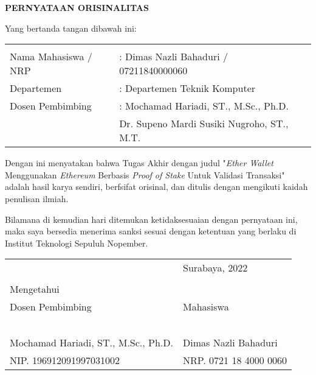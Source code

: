 \begin{center}
  \large
  \textbf{PERNYATAAN ORISINALITAS}
\end{center}

\thispagestyle{empty}

\vspace{2ex}


\noindent Yang bertanda tangan dibawah ini:

\noindent\begin{tabularx}{\textwidth}{X X l}
  & \\
  Nama Mahasiswa / NRP &: Dimas Nazli Bahaduri / 07211840000060 \\
  Departemen &: Departemen Teknik Komputer\\
  Dosen Pembimbing &: Mochamad Hariadi, ST., M.Sc., Ph.D. \\
  & Dr. Supeno Mardi Susiki Nugroho, ST., M.T. \\
\end{tabularx}

Dengan ini menyatakan bahwa Tugas Akhir dengan judul "\emph{Ether Wallet} Menggunakan \emph{Ethereum} Berbasis \emph{Proof of Stake} Untuk Validasi Transaksi" adalah hasil karya sendiri, berfsifat orisinal, dan ditulis dengan mengikuti kaidah penulisan ilmiah.

Bilamana di kemudian hari ditemukan ketidaksesuaian dengan pernyataan ini, maka saya bersedia menerima sanksi sesuai dengan ketentuan yang berlaku di Institut Teknologi Sepuluh Nopember.

\vspace{8ex}

\noindent\begin{tabularx}{\textwidth}{X l}
  & Surabaya,  2022\\
  & \\
  Mengetahui & \\
  Dosen Pembimbing & Mahasiswa\\
  & \\
  & \\
  & \\
  & \\
  & \\
  Mochamad Hariadi, ST., M.Sc., Ph.D. & Dimas Nazli Bahaduri \\
  NIP. 196912091997031002 & NRP. 0721 18 4000 0060\\
\end{tabularx}